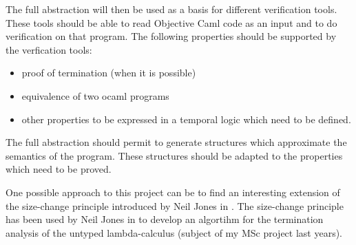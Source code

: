 \documentclass{article}
\begin{document}
The full abstraction will then be used as a basis for different verification tools.
These tools should be able to read Objective Caml code as an input and to do verification
on that program. The following properties should be supported by the verfication tools:
\begin{itemize}
\item proof of termination (when it is possible)
\item equivalence of two ocaml programs
\item other properties to be expressed in a temporal logic which need to be defined.
\end{itemize}


The full abstraction should permit to generate structures which approximate the semantics of the program.
These structures should be adapted to the properties which need to be proved.

One possible approach to this project can be to find an interesting extension of the size-change principle introduced by Neil Jones in \cite{jones01}. The size-change principle has been used by Neil Jones in \cite{jones04} to develop
an algortihm for the termination analysis of the untyped lambda-calculus (subject of my MSc project last years).

\pagebreak



\end{document}
